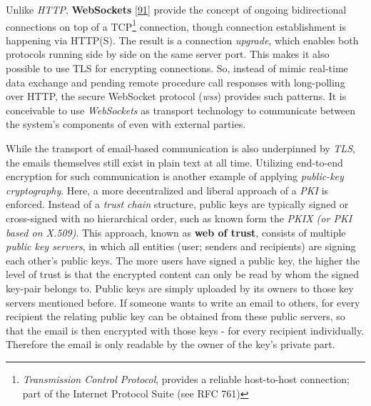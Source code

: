 \documentclass[12pt,english,a4paper,titlepage,cleardoublepage=empty,dottedtoc]{report}
\begin{document}
Unlike \emph{HTTP}, \textbf{WebSockets}
{[}\protect\hyperlink{ref-web_spec_websockets}{91}{]} provide the
concept of ongoing bidirectional connections on top of a TCP\footnote{\emph{Transmission
  Control Protocol}, provides a reliable host-to-host connection; part
  of the Internet Protocol Suite (see RFC 761)} connection, though
connection establishment is happening via HTTP(S). The result is a
connection \emph{upgrade}, which enables both protocols running side by
side on the same server port. This makes it also possible to use TLS for
encrypting connections. So, instead of mimic real-time data exchange and
pending remote procedure call responses with long-polling over HTTP, the
secure WebSocket protocol (\emph{wss}) provides such patterns. It is
conceivable to use \emph{WebSockets} as transport technology to
communicate between the system's components of even with external
parties.

While the transport of email-based communication is also underpinned by
\emph{TLS}, the emails themselves still exist in plain text at all time.
Utilizing end-to-end encryption for such communication is another
example of applying \emph{public-key cryptography}. Here, a more
decentralized and liberal approach of a \emph{PKI} is enforced. Instead
of a \emph{trust chain} structure, public keys are typically signed or
cross-signed with no hierarchical order, such as known form the
\emph{PKIX (or PKI based on X.509)}. This approach, known as \textbf{web
of trust}, consists of multiple \emph{public key servers}, in which all
entities (user; senders and recipients) are signing each other's public
keys. The more users have signed a public key, the higher the level of
trust is that the encrypted content can only be read by whom the signed
key-pair belongs to. Public keys are simply uploaded by its owners to
those key servers mentioned before. If someone wants to write an email
to others, for every recipient the relating public key can be obtained
from these public servers, so that the email is then encrypted with
those keys - for every recipient individually. Therefore the email is
only readable by the owner of the key's private part.
\end{document}
